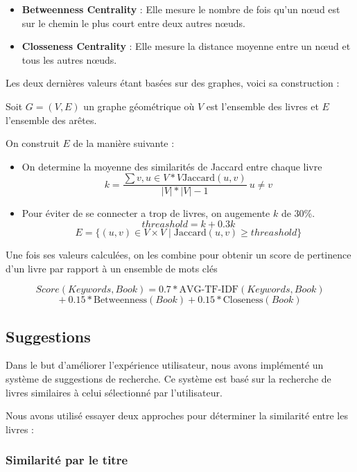 \begin{itemize}
\item
  \textbf{Betweenness Centrality} : Elle mesure le nombre de fois qu'un
  nœud est sur le chemin le plus court entre deux autres nœuds.
\item
  \textbf{Closseness Centrality} : Elle mesure la distance moyenne entre
  un nœud et tous les autres nœuds.
\end{itemize}

Les deux dernières valeurs étant basées sur des graphes, voici sa
construction :

Soit \(G = (V, E)\) un graphe géométrique où \(V\) est l'ensemble des
livres et \(E\) l'ensemble des arêtes.

On construit \(E\) de la manière suivante :

\begin{itemize}
\tightlist
\item
  On determine la moyenne des similarités de Jaccard entre chaque livre
  \[ k = \frac{\sum{v,u \in V*V} \text{Jaccard}(u, v)}{|V|*|V|-1}\ u \neq v\]
\item
  Pour éviter de se connecter a trop de livres, on augemente \(k\) de
  30\%. \[ threashold = k + 0.3k\]
  \[ E = \{(u, v) \in V \times V \mid \text{Jaccard}(u, v) \geq threashold\}\]
\end{itemize}

Une fois ses valeurs calculées, on les combine pour obtenir un score de
pertinence d'un livre par rapport à un ensemble de mots clés

\[Score(Keywords, Book) = 0.7*\text{AVG-TF-IDF}(Keywords, Book)\]
\[ +\ 0.15*\text{Betweenness}(Book) + 0.15*\text{Closeness}(Book)\]

\subsection{Suggestions}\label{suggestions}

Dans le but d'améliorer l'expérience utilisateur, nous avons implémenté
un système de suggestions de recherche. Ce système est basé sur la
recherche de livres similaires à celui sélectionné par l'utilisateur.

Nous avons utilisé essayer deux approches pour déterminer la similarité
entre les livres :

\subsubsection{Similarité par le
titre}\label{similarituxe9-par-le-titre}


